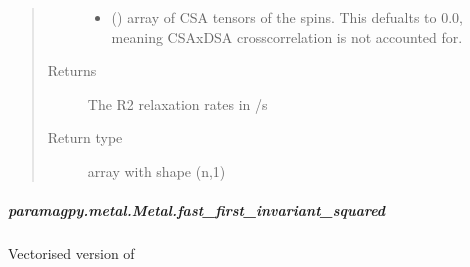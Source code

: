 \documentclass[a4paper,10pt,english,openany,oneside]{sphinxmanual}
\begin{document}
\begin{fulllineitems}
\begin{fulllineitems}
\begin{fulllineitems}
\begin{quote}
\begin{description}
\begin{itemize}
\item {} 
 (\sphinxstyleliteralemphasis{\sphinxupquote{ (}}\sphinxstyleliteralemphasis{\sphinxupquote{,}}\sphinxstyleliteralemphasis{\sphinxupquote{,}}\sphinxstyleliteralemphasis{\sphinxupquote{) }}\sphinxstyleliteralemphasis{\sphinxupquote{(}}\sphinxstyleliteralemphasis{\sphinxupquote{)}}) \textendash{} array of CSA tensors of the spins.
This defualts to 0.0, meaning CSAxDSA crosscorrelation is
not accounted for.

\end{itemize}

\item[{Returns}] \leavevmode
{} \textendash{} The R2 relaxation rates in /s

\item[{Return type}] \leavevmode
array with shape (n,1)

\end{description}\end{quote}

\end{fulllineitems}



\subparagraph{paramagpy.metal.Metal.fast\_first\_invariant\_squared}
\label{\detokenize{reference/generated/paramagpy.metal.Metal.fast_first_invariant_squared:paramagpy-metal-metal-fast-first-invariant-squared}}\label{\detokenize{reference/generated/paramagpy.metal.Metal.fast_first_invariant_squared::doc}}

\begin{fulllineitems}
\label{\detokenize{reference/generated/paramagpy.metal.Metal.fast_first_invariant_squared:paramagpy.metal.Metal.fast_first_invariant_squared}}
Vectorised version of
{\hyperref[\detokenize{reference/generated/paramagpy.metal.Metal.first_invariant_squared:paramagpy.metal.Metal.first_invariant_squared}]{}}


\end{fulllineitems}
\end{fulllineitems}
\end{fulllineitems}
\end{document}
